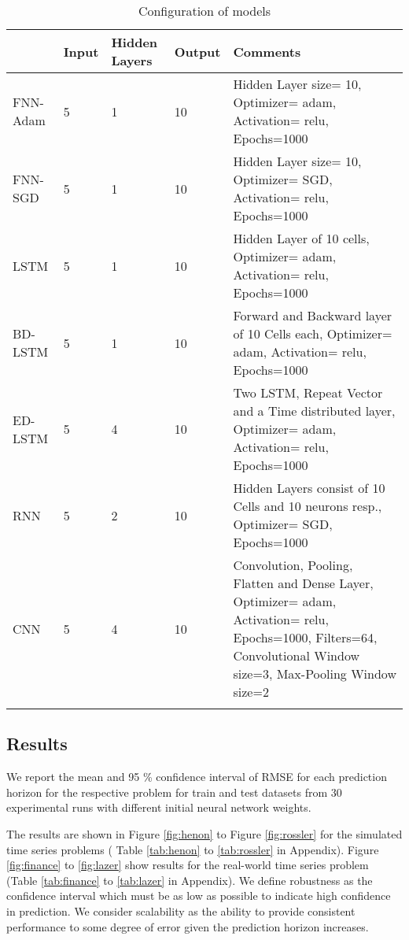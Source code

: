 \documentclass[final,5p,times,twocolumn]{elsarticle}
\begin{document}
\begin{table*}[htbp!]
 \small 
 \centering
\begin{tabular}{llllp{11cm}}
\hline
 &  Input & Hidden Layers & Output & Comments  \\
\hline
\hline
FNN-Adam &      5&1&10& Hidden Layer size= 10, Optimizer= adam, Activation= relu, Epochs=1000\\
FNN-SGD & 5 & 1&10& Hidden Layer size= 10, Optimizer= SGD, Activation= relu, Epochs=1000\\

LSTM &      5&1&10& Hidden Layer of 10 cells, Optimizer= adam, Activation= relu, Epochs=1000\\
BD-LSTM &      5&1&10&Forward and Backward layer of 10 Cells each, Optimizer= adam, Activation= relu, Epochs=1000\\
ED-LSTM&      5&4&10& Two LSTM, Repeat Vector and a Time distributed layer, Optimizer= adam, Activation= relu, Epochs=1000\\
RNN &      5&2&10& Hidden Layers consist of 10 Cells and 10 neurons resp., Optimizer= SGD, Epochs=1000\\
CNN &      5&4&10&Convolution, Pooling, Flatten and Dense Layer, Optimizer= adam, Activation= relu, Epochs=1000, Filters=64, Convolutional Window size=3, Max-Pooling Window size=2\\ 

\hline &
\end{tabular}
\caption{Configuration of models }
\label{tab:config}
\end{table*}

 
 
 
\subsection{Results}


We report the mean and 95 \% confidence interval of RMSE for each prediction horizon for the respective problem  for train and test datasets from 30 experimental runs with different initial neural network weights.

The results are shown in  Figure \ref{fig:henon} to Figure  \ref{fig:rossler} for the simulated time series problems ( Table \ref{tab:henon} to \ref{tab:rossler} in Appendix). Figure \ref{fig:finance} to \ref{fig:lazer} show results for the real-world time series problem (Table \ref{tab:finance} to \ref{tab:lazer} in Appendix). We define robustness as the confidence interval which must be as low as possible to indicate high confidence in prediction. We consider scalability as the ability to provide consistent performance to some degree of error given the prediction horizon increases.
\end{document}
